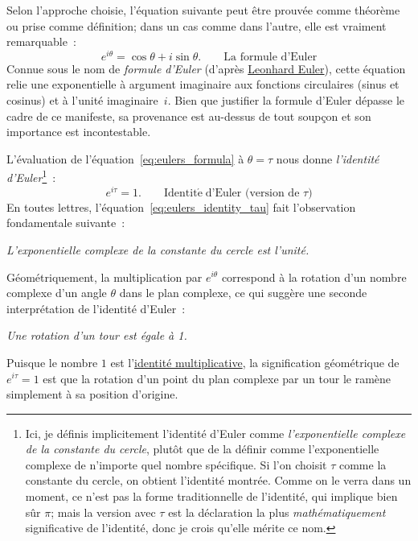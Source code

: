 Selon l'approche choisie, l'équation suivante peut être prouvée comme
théorème ou prise comme définition\ns; dans un cas comme dans l'autre, elle est vraiment remarquable~:
\begin{equation}
\label{eq:eulers_formula}
e^{i\theta} = \cos\theta + i\sin\theta. \qquad\mbox{La formule d'Euler}
\end{equation}
Connue sous le nom de \emph{formule d'Euler} (d'après
\href{https://fr.wikipedia.org/wiki/Leonhard_Euler}{Leonhard Euler}), cette
équation relie une exponentielle à argument imaginaire aux fonctions circulaires
(sinus et cosinus) et à l'unité imaginaire~$i$. Bien que justifier la formule
d'Euler dépasse le cadre de ce manifeste, sa provenance est au-dessus de tout
soupçon et son importance est incontestable.

L'évaluation de l'équation~\eqref{eq:eulers_formula} à $\theta = \tau$ nous donne
\emph{l'identité d'Euler}\ns\footnote{Ici, je définis implicitement l'identité
d'Euler comme \emph{l'exponentielle complexe de la constante du cercle}, plutôt
que de la définir comme l'exponentielle complexe de n'importe quel nombre spécifique. Si l'on
choisit $\tau$ comme la constante du cercle, on obtient l'identité montrée.
Comme on le verra dans un moment, ce n'est pas la forme traditionnelle de l'identité,
qui implique bien sûr $\pi$\ns; mais la version avec $\tau$ est la déclaration
la plus \emph{mathématiquement} significative de l'identité, donc je crois qu'elle
mérite ce nom.}~:
\begin{equation}
\label{eq:eulers_identity_tau}
e^{i\tau} = 1. \qquad\mathrm{Identit\acute{e}}\; \mbox{d'Euler (version de $\tau$)}
\end{equation}
En toutes lettres, l'équation~\eqref{eq:eulers_identity_tau} fait l'observation
fondamentale suivante~:

\begin{center}
\emph{L'exponentielle complexe de la constante du cercle est l'unité.}
\end{center}

Géométriquement, la multiplication par $e^{i\theta}$ correspond à la rotation
d'un nombre complexe d'un angle $\theta$ dans le plan complexe, ce qui suggère
une seconde interprétation de l'identité d'Euler~:

\begin{center}
\emph{Une rotation d'un tour est égale à 1.}
\end{center}

\noindent Puisque le nombre $1$ est
l'\href{https://fr.wikipedia.org/wiki/%C3%89l%C3%A9ment_neutre}{identité
multiplicative}, la signification géométrique de $e^{i\tau} = 1$ est que la
rotation d'un point du plan complexe par un tour le ramène simplement à sa
position d'origine.

